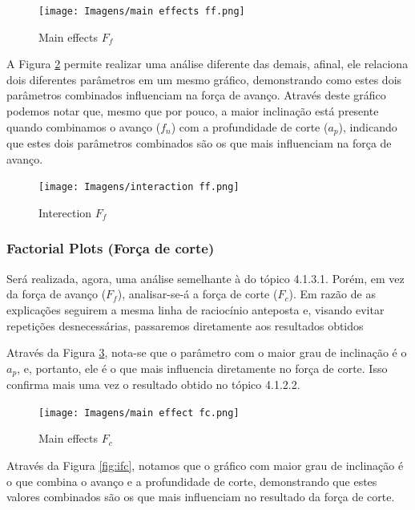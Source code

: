\documentclass[deposito, acronym, symbols]{fei}
\begin{document}
\begin{figure}[!htp]
    \centering
    \caption{Main effects $F_f$}
    \texttt{[image: Imagens/main effects ff.png]}
    \label{fig:mff}
\end{figure}

A Figura \ref{fig:iff} permite realizar uma análise diferente das demais, afinal, ele relaciona dois diferentes parâmetros em um mesmo gráfico, demonstrando como estes dois parâmetros combinados influenciam na força de avanço. Através deste gráfico podemos notar que, mesmo que por pouco, a maior inclinação está presente quando combinamos o avanço ($f_n$) com a profundidade de corte ($a_p$), indicando que estes dois parâmetros combinados são os que mais influenciam na força de avanço. 

\begin{figure}[!htp]
    \centering
    \caption{Interection $F_f$}
    \texttt{[image: Imagens/interaction ff.png]}
    \label{fig:iff}
\end{figure}

\subsubsection{Factorial Plots (Força de corte)}

Será realizada, agora, uma análise semelhante à do tópico 4.1.3.1. Porém, em vez da força de avanço ($F_f$), analisar-se-á a força de corte ($F_c$). Em razão de as explicações seguirem a mesma linha de raciocínio anteposta e, visando evitar repetições desnecessárias, passaremos diretamente aos resultados obtidos

Através da Figura \ref{fig:mfc}, nota-se que o parâmetro com o maior grau de inclinação é o $a_p$, e, portanto, ele é o que mais influencia diretamente no força de corte. Isso confirma mais uma vez o resultado obtido no tópico 4.1.2.2.

\begin{figure}[!htp]
    \centering
    \caption{Main effects $F_c$}
    \texttt{[image: Imagens/main effect fc.png]}
    \label{fig:mfc}
\end{figure}

Através da Figura \ref{fig:ifc}, notamos que o gráfico com maior grau de inclinação é o que combina o avanço e a profundidade de corte, demonstrando que estes valores combinados são os que mais influenciam no resultado da força de corte. 
\end{document}
